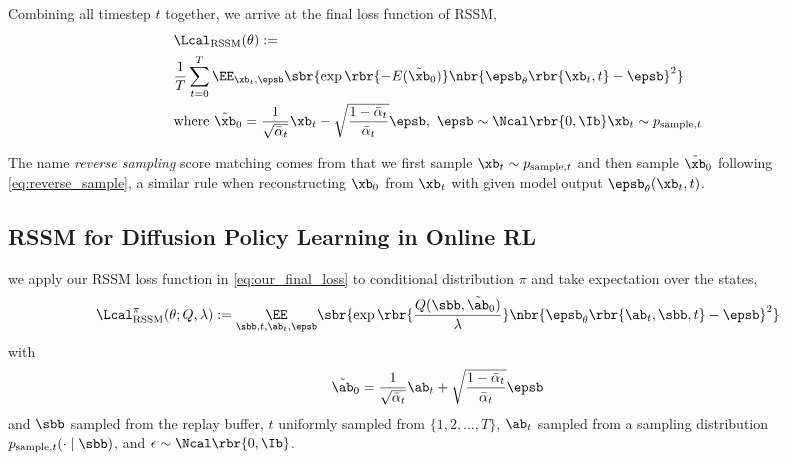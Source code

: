 Combining all timestep $t$ together, we arrive at the final loss function of RSSM,
\begin{subequations}
    \begin{align}
        & \Lcal_{\rm RSSM}(\theta) := \notag\\
        &\frac{1}{T}\sum_{t=0}^T\EE_{\xb_t,\epsb}\sbr{\exp\rbr{-E(\tilde\xb_0)}\nbr{\epsb_\theta\rbr{\xb_t, t} - \epsb}^2}\label{eq:our_final_loss}\\
        &\text{where}~ \tilde\xb_0 = \frac{1}{\sqrt{\bar\alpha_t}}\xb_t - \sqrt{\frac{1 - \bar\alpha_t}{\bar\alpha_t}}\epsb,\ \epsb\sim\Ncal\rbr{0,\Ib}\xb_t\sim p_{{\rm sample},t}\label{eq:reverse_sample}
    \end{align}
\end{subequations}


\begin{remark}
    The name \emph{reverse sampling} score matching comes from that we first sample $\xb_t\sim p_{{\rm sample}, t}$ and then sample $\tilde\xb_0$ following \eqref{eq:reverse_sample}, a similar rule when reconstructing $\xb_0$ from $\xb_t$ with given model output $\epsb_\theta(\xb_t, t)$. 
\end{remark}

\subsection{RSSM for Diffusion Policy Learning in Online RL}
we apply our RSSM loss function in \eqref{eq:our_final_loss} to conditional distribution $\pi$ and take expectation over the states,
{
\small
\begin{equation}
    \Lcal^{\pi}_{\rm RSSM}(\theta;Q,\lambda) :=\underset{{\sbb, t,\ab_t,\epsb}}{\EE}\sbr{\exp\rbr{\frac{Q(\sbb,\tilde\ab_0)}{\lambda}}\nbr{ \epsb_\theta\rbr{\ab_t,\sbb,  t} - \epsb}^2}\label{eq:policy_loss}
\end{equation}
}
with 
\begin{equation}
    \tilde\ab_0 = \frac{1}{\sqrt{\bar\alpha_t}}\ab_t + \sqrt{\frac{1 - \bar\alpha_t}{\bar\alpha_t}}\epsb\label{eq:a0_sample}
\end{equation}
and $\sbb$ sampled from the replay buffer, $t$ uniformly sampled from $\{1,2,\dots,T\}$, $\ab_t$ sampled from a sampling distribution $p_{{\rm sample}, t}(\cdot\mid \sbb)$, and $\epsilon\sim\Ncal\rbr{0, \Ib}$. 

